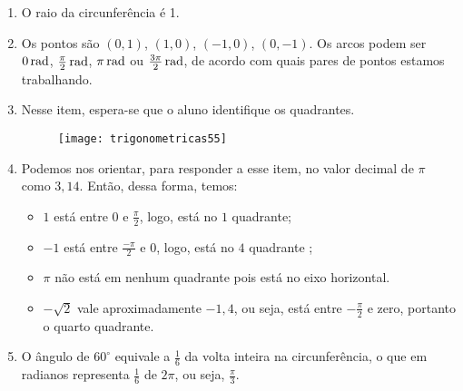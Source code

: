 \documentclass[10 pt,usenames,dvipsnames, oneside]{article}
\begin{document}
\ifdefined\prof
\begin{solucao}

\begin{enumerate}
\item O raio da circunferência é 1.
\item  Os pontos são $(0,1)$, $(1,0)$, $(-1,0)$, $(0,-1)$. Os arcos podem ser $0\operatorname{rad}$, $\frac{\pi}{2}\operatorname{rad}$, $\pi\operatorname{rad}$ ou $\frac{3\pi}{2}\operatorname{rad}$, de acordo com quais pares de pontos estamos trabalhando.
\item Nesse item, espera-se que o aluno identifique os quadrantes.
\begin{figure}[H]
\centering

\texttt{[image: trigonometricas55]}
\end{figure}

\item Podemos nos orientar, para responder a esse item, no valor decimal de $\pi$ como $3{,}14$. Então, dessa forma, temos: 
\begin{itemize}
\item $1$ está entre $0$ e $\frac{\pi}{2}$, logo, está no $1$ quadrante;
\item $-1$ está entre $\frac{-\pi}{2}$ e $0$, logo, está no $4$ quadrante ;
\item $\pi$ não está em nenhum quadrante pois está no eixo horizontal. 
\item $-\sqrt{2}$ vale aproximadamente $-1{,}4$, ou seja, está entre $-\frac{\pi}{2}$ e zero, portanto o quarto quadrante.
\end{itemize}
\item O ângulo de $60^{\circ}$ equivale a $\frac{1}{6}$ da volta inteira na circunferência, o que em radianos representa $\frac{1}{6}$ de $2\pi$, ou seja, $\frac{\pi}{3}$.
\end{enumerate}

\end{solucao}
\fi
\end{document}
